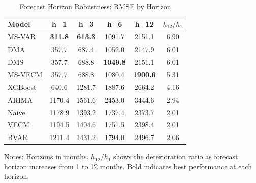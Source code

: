 \begin{table}[htbp]
\centering
\small
\caption{Forecast Horizon Robustness: RMSE by Horizon}
\label{tab:horizon}
\begin{tabular}{lccccc}
\toprule
Model & h=1 & h=3 & h=6 & h=12 & $h_{12}/h_1$ \\
\midrule
MS-VAR & \textbf{311.8} & \textbf{613.3} & 1091.7 & 2151.1 & 6.90 \\
DMA & 357.7 & 687.4 & 1052.0 & 2147.9 & 6.01 \\
DMS & 357.7 & 688.8 & \textbf{1049.8} & 2151.1 & 6.01 \\
MS-VECM & 357.7 & 688.8 & 1080.4 & \textbf{1900.6} & 5.31 \\
XGBoost & 640.6 & 1281.7 & 1887.6 & 2664.2 & 4.16 \\
ARIMA & 1170.4 & 1561.6 & 2453.0 & 3444.6 & 2.94 \\
Naive & 1178.9 & 1393.2 & 1737.4 & 2373.7 & 2.01 \\
VECM & 1194.5 & 1404.6 & 1751.5 & 2398.4 & 2.01 \\
BVAR & 1211.4 & 1431.2 & 1794.0 & 2496.7 & 2.06 \\
\bottomrule
\end{tabular}
\begin{tablenotes}
\small
\item Notes: Horizons in months. $h_{12}/h_1$ shows the deterioration 
ratio as forecast horizon increases from 1 to 12 months. 
Bold indicates best performance at each horizon.
\end{tablenotes}
\end{table}